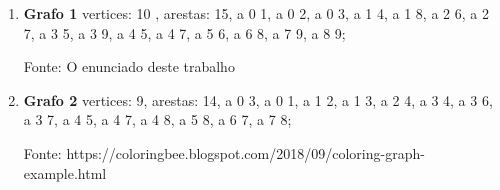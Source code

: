 \documentclass[12pt,openright,oneside,a4paper,brazil]{abntex2}
\begin{document}
\begin{enumerate}
	\item 	\textbf{Grafo 1} \newline
		vertices: 10 , arestas: 15,
		a 0 1, \newline
		a 0 2, \newline
		a 0 3, \newline
		a 1 4, \newline
		a 1 8, \newline
		a 2 6, \newline
		a 2 7, \newline
		a 3 5, \newline
		a 3 9, \newline
		a 4 5, \newline
		a 4 7, \newline
		a 5 6, \newline
		a 6 8, \newline
		a 7 9, \newline
		a 8 9;
		
		Fonte: O enunciado deste trabalho
	\item \textbf{Grafo 2} \newline 
		vertices: 9, arestas: 14, \newline
		a 0 3, \newline
		a 0 1, \newline
		a 1 2, \newline
		a 1 3, \newline
		a 2 4, \newline
		a 3 4, \newline
		a 3 6, \newline
		a 3 7, \newline
		a 4 5, \newline
		a 4 7, \newline
		a 4 8, \newline
		a 5 8, \newline
		a 6 7, \newline
		a 7 8;
		
		Fonte: https://coloringbee.blogspot.com/2018/09/coloring-graph-example.html
\end{enumerate}
\end{document}
